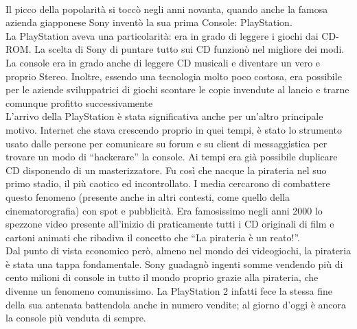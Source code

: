 \\Il picco della popolarità si toccò negli anni novanta, quando anche la famosa azienda giapponese Sony inventò la sua prima Console: PlayStation.\\La PlayStation aveva una particolarità: era in grado di leggere i giochi dai CD-ROM. La scelta di Sony di puntare tutto sui CD funzionò nel migliore dei modi. La console era in grado anche di leggere CD musicali e diventare un vero e proprio Stereo. Inoltre, essendo una tecnologia molto poco costosa, era possibile per le aziende sviluppatrici di giochi scontare le copie invendute al lancio e trarne comunque profitto successivamente\\L’arrivo della PlayStation è stata significativa anche per un’altro principale motivo. Internet che stava crescendo proprio in quei tempi, è stato lo strumento usato dalle persone per comunicare su forum e su client di messaggistica per trovare un modo di “hackerare” la console. Ai tempi era già possibile duplicare CD disponendo di un masterizzatore. Fu così che nacque la pirateria nel suo primo stadio, il più caotico ed incontrollato. I media cercarono di combattere questo fenomeno (presente anche in altri contesti, come quello della cinematorografia) con spot e pubblicità. Era famosissimo negli anni 2000 lo spezzone video presente all’inizio di praticamente tutti i CD originali di film e cartoni animati che ribadiva il concetto che “La pirateria è un reato!”.\\Dal punto di vista economico però, almeno nel mondo dei videogiochi, la pirateria è stata una tappa fondamentale. Sony guadagnò ingenti somme vendendo più di cento milioni di console in tutto il mondo proprio grazie alla pirateria, che divenne un fenomeno comunissimo. La PlayStation 2 infatti fece la stessa fine della sua antenata battendola anche in numero vendite; al giorno d’oggi è ancora la console più venduta di sempre.
